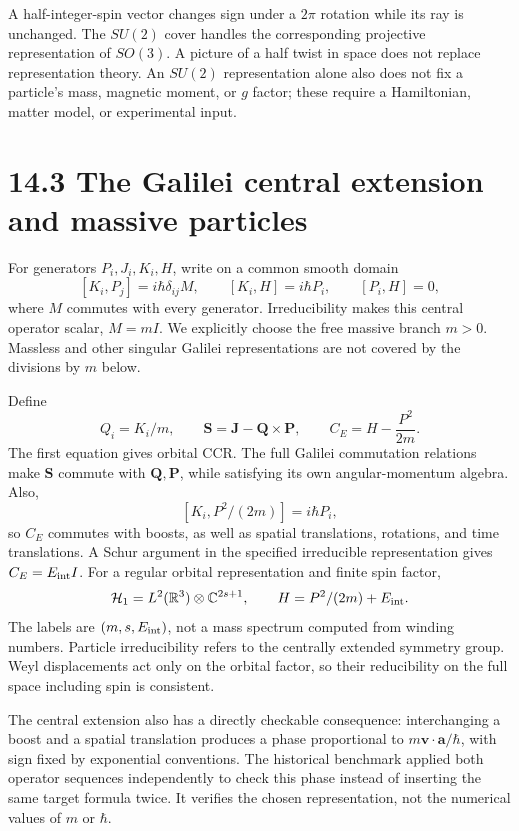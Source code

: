 \documentclass[
  11pt,
  oneside]{book}
\begin{document}
A half-integer-spin vector changes sign under a \(2\pi\) rotation while
its ray is unchanged. The \(SU(2)\) cover handles the corresponding
projective representation of \(SO(3)\). A picture of a half twist in
space does not replace representation theory. An \(SU(2)\)
representation alone also does not fix a particle's mass, magnetic
moment, or \(g\) factor; these require a Hamiltonian, matter model, or
experimental input.

\section{14.3 The Galilei central extension and massive particles}

For generators \(P_i,J_i,K_i,H\), write on a common smooth domain \[
[K_i,P_j]=i\hbar\delta_{ij}M,\qquad
[K_i,H]=i\hbar P_i,\qquad [P_i,H]=0,
\] where \(M\) commutes with every generator. Irreducibility makes this
central operator scalar, \(M=mI\). We explicitly choose the free massive
branch \(m>0\). Massless and other singular Galilei representations are
not covered by the divisions by \(m\) below.

Define \[
Q_i=K_i/m,\qquad
\mathbf S=\mathbf J-\mathbf Q\times\mathbf P,
\qquad C_E=H-\frac{P^2}{2m}.
\] The first equation gives orbital CCR. The full Galilei commutation
relations make \(\mathbf S\) commute with \(\mathbf Q,\mathbf P\), while
satisfying its own angular-momentum algebra. Also, \[
[K_i,P^2/(2m)]=i\hbar P_i,
\] so \(C_E\) commutes with boosts, as well as spatial translations,
rotations, and time translations. A Schur argument in the specified
irreducible representation gives \(C_E=E_{\rm int}I\). For a regular
orbital representation and finite spin factor, \[
\mathcal H_1=L^2(\mathbb R^3)\otimes\mathbb C^{2s+1},\qquad
H=P^2/(2m)+E_{\rm int}.
\] The labels are \((m,s,E_{\rm int})\), not a mass spectrum computed
from winding numbers. Particle irreducibility refers to the centrally
extended symmetry group. Weyl displacements act only on the orbital
factor, so their reducibility on the full space including spin is
consistent.

The central extension also has a directly checkable consequence:
interchanging a boost and a spatial translation produces a phase
proportional to \(m\mathbf v\cdot\mathbf a/\hbar\), with sign fixed by
exponential conventions. The historical benchmark applied both operator
sequences independently to check this phase instead of inserting the
same target formula twice. It verifies the chosen representation, not
the numerical values of \(m\) or \(\hbar\).
\end{document}
